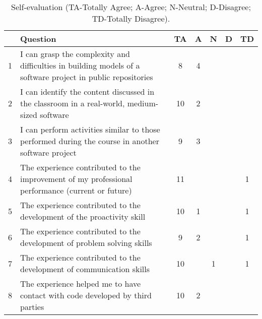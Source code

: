 \begin{table*}[bt]
    \centering
    \caption{Self-evaluation (TA-Totally Agree; A-Agree; N-Neutral; D-Disagree; TD-Totally Disagree).}
    \label{tab:likert_2}
    \begin{tabular}{l|p{13cm}|c|c|c|c|c}
    \hline
    & \textbf{Question} & \textbf{TA} & \textbf{A} & \textbf{N} & \textbf{D} & \textbf{TD}\\
    \hline
    1 & I can grasp the complexity and difficulties in building models of a software project in public repositories &8 &4 &&& \\
    2 & I can identify the content discussed in the classroom in a real-world, medium-sized software &10 &2 &&& \\
    3 & I can perform activities similar to those performed during the course in another software project &9 &3 &&& \\
    4 & The experience contributed to the improvement of my professional performance (current or future) &11 &&&& 1\\
    5 & The experience contributed to the development of the proactivity skill &10 &1 &&& 1\\
    6 & The experience contributed to the development of problem solving skills &9 &2 &&& 1 \\
    7 & The experience contributed to the development of communication skills &10 &&1 && 1\\
    8 & The experience helped me to have contact with code developed by third parties &10 & 2&&& \\
    \hline
    \end{tabular}
\end{table*}